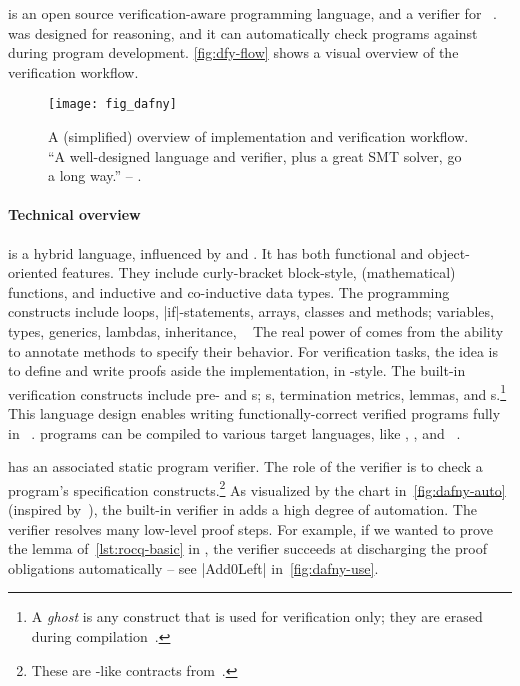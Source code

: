  is an open source verification-aware programming language, and a
verifier for ~\cite{leino2010,dafnylang}.
 was designed for reasoning, and it can automatically check programs
against  during program development. \autoref{fig:dfy-flow}
shows a visual overview of the verification workflow.

\begin{figure}[ht]
\centering
\texttt{[image: fig\_dafny]}
\caption[Overview of Dafny implementation and verification workflow]{
A (simplified) overview of  implementation and verification workflow.
\enquote{A well-designed language and verifier, plus a great SMT solver, go a
long way.} -- \textcite{leino2010b}.}
\label{fig:dfy-flow}
\end{figure}

\paragraph*{Technical overview}
 is a hybrid language, influenced by  and . It has
both functional and object-oriented features. They include curly-bracket
block-style, (mathematical) functions, and inductive and
co-inductive data types. The programming constructs include
loops, \pr|if|-statements, arrays, classes and methods; variables, types,
generics, lambdas, inheritance, \etc~\cite{dafnydoc} The real power of
 comes from the ability to annotate methods to specify their
behavior. For verification tasks, the idea is to define  and
write proofs aside the implementation, in -style.
The built-in verification constructs include pre- and
s; s, termination metrics, lemmas, and
s.\footnote{A \emph{ghost} is any construct that is used
for verification only; they are erased during compilation~\cite[p.
19]{leino2023}.} This language design enables writing functionally-correct
verified programs fully in ~\cite{leino2023}.  programs
can be compiled to various target languages, like , , and
~\cite{dafnydoc}.

 has an associated static program verifier. The role of the verifier
is to check a program's specification constructs.\footnote{These are
-like contracts from~\cite{meyer1988}.} As visualized by the chart
in~\autoref{fig:dafny-auto} (inspired by~\cite{leino2010b}), the built-in
verifier in  adds a high degree of automation. The verifier resolves many
low-level proof steps. For example, if we wanted to prove the lemma
of~\autoref{lst:rocq-basic} in , the verifier succeeds at discharging the
proof obligations automatically -- see \pr|Add0Left| in~\autoref{fig:dafny-use}.

